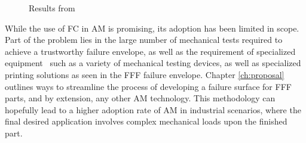 \documentclass[main.tex]{subfiles}
\begin{document}
\begin{figure}[!htbp]
	\center
	\hfill
	\caption{Results from \cite{MazzeiJCompSci}} \label{fig:jcompscir}
\end{figure} 

\pagebreak
While the use of FC in AM is promising, its adoption has been limited in scope. Part of the problem lies in the large number of mechanical tests required to achieve a trustworthy failure envelope, as well as the requirement of specialized equipment \textendash~such as a variety of mechanical testing devices, as well as specialized printing solutions as seen in the FFF failure envelope. Chapter \ref{ch:proposal} outlines ways to streamline the process of developing a failure surface for FFF parts, and by extension, any other AM technology. This methodology can hopefully lead to a higher adoption rate of AM in industrial scenarios, where the final desired application involves complex mechanical loads upon the finished part. 

% 
% 
% 
% 

\end{document}
